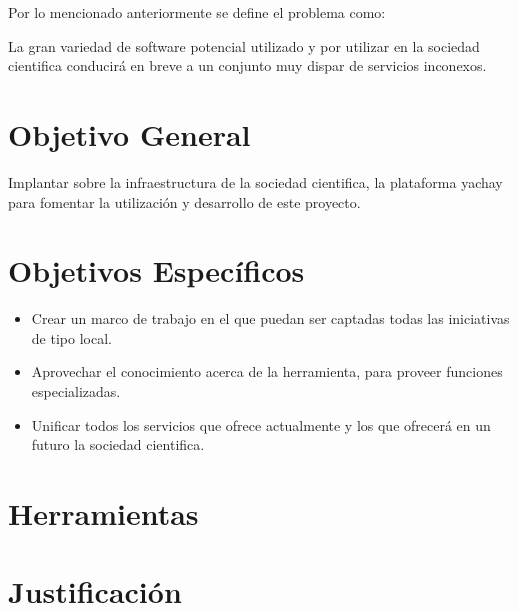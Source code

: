 \documentclass[letter,12pt]{article}
\begin{document}
Por lo mencionado anteriormente se define el problema como:

La gran variedad de software potencial utilizado y por utilizar en la sociedad cientifica conducirá 
en breve a un conjunto muy dispar de servicios inconexos.

\section{Objetivo General}
Implantar sobre la infraestructura de la sociedad cientifica, la plataforma yachay para fomentar la
utilización y desarrollo de este proyecto.

\section{Objetivos Específicos}
\begin{itemize}
\item Crear un marco de trabajo en el que puedan ser captadas todas las iniciativas de tipo local.
\item Aprovechar el conocimiento acerca de la herramienta, para proveer funciones especializadas.
\item Unificar todos los servicios que ofrece actualmente y los que ofrecerá en un futuro la
sociedad cientifica.
\end{itemize}

\section{Herramientas}

\section{Justificación}

\begin{thebibliography}{99}
\end{thebibliography}
\end{document}
